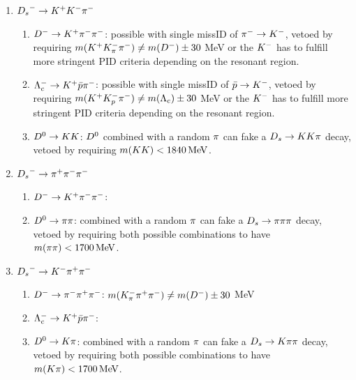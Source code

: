 \begin{enumerate}


\item $\Ds^-\to\kaon^+\kaon^-\pion^-$

\begin{enumerate}
	\item $\Dm \to\Kp\pim\pim$: 
	possible with single missID of $\pim\rightarrow\Km$, vetoed by requiring 
	$m(\Kp K^-_\pi \pim) \ne m(D^-) \pm 30$ MeV 
	or the $\Km$ has to fulfill more stringent PID criteria depending on the resonant region.
	
	\item $\Lambda_c^- \to \Kp \bar p \pim $: 
	possible with single missID of $\bar p \rightarrow\Km$, vetoed by requiring
	$m(\Kp K^-_p \pim) \ne m(\Lambda_c) \pm 30$ MeV
	or the $\Km$ has to fulfill more stringent PID criteria depending on the resonant region.
	
	\item $\Dz\to\kaon\kaon$: $\Dz$ combined with a random $\pion$ can fake a $\Ds\to\kaon\kaon\pion$ decay, vetoed by requiring $m(\kaon\kaon) < 1840 \mev$. 
\end{enumerate}

\item $\Ds^-\to\pion^+\pion^-\pion^-$

\begin{enumerate}
        \item $\Dm \to\Kp\pim\pim$: 
	
	\item $\Dz\to\pion\pion$: 
		combined with a random $\pion$ can fake a $\Ds\to\pion\pion\pion$ decay, 
		vetoed by requiring both possible combinations to have $m(\pion\pion) < 1700 \mev$.
\end{enumerate}

\item $\Ds^- \to K^- \pion^+\pion^-$

\begin{enumerate}
	\item $\Dm \to\pim \pip \pim$:  	$m(K^-_\pi \pip \pim) \ne m(D^-) \pm 30$ MeV 


	\item $\Lambda_c^- \to \Kp \bar p \pim $: 

	\item $\Dz\to\kaon\pion$: 
		combined with a random $\pion$ can fake a $\Ds\to\kaon\pion\pion$ decay, 
		vetoed by requiring both possible combinations to have $m(\kaon\pion) < 1700 \mev$.
\end{enumerate}

\end{enumerate}
